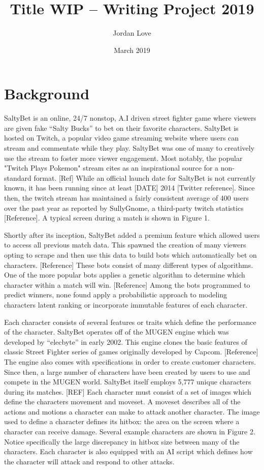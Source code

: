 \documentclass{article}
\title{Title WIP -- Writing Project 2019}
\author{Jordan Love}
\date{March 2019}
\begin{document}
\maketitle

\section{Background}

SaltyBet is an online, 24/7 nonstop, A.I driven street fighter game where viewers are given fake ``Salty Bucks'' to bet on their favorite characters. SaltyBet is hosted on Twitch, a popular video game streaming website where users can stream and commentate while they play. SaltyBet was one of many to creatively use the stream to foster more viewer engagement. Most notably, the popular "Twitch Plays Pokemon" stream cites as an inspirational source for a non-standard format. [Ref] While an official launch date for SaltyBet is not currently known, it has been running since at least [DATE] 2014 [Twitter reference]. Since then, the twitch stream has maintained a fairly consistent average of 400 users over the past year as reported by SullyGnome, a third-party twitch statistics [Reference]. A typical screen during a match is shown in Figure 1.

Shortly after its inception, SaltyBet added a premium feature which allowed users to access all previous match data. This spawned the creation of many viewers opting to scrape and then use this data to build bots which automatically bet on characters. [Reference] These bots consist of many different types of algorithms. One of the more popular bots applies a genetic algorithm to determine which character within a match will win. [Reference] Among the bots programmed to predict winners, none found apply a probabilistic approach to modeling characters latent ranking or incorporate immutable features of each character. 

Each character consists of several features or traits which define the performance of the character. SaltyBet operates off of the MUGEN engine which was developed by ``elecbyte'' in early 2002. This engine clones the basic features of classic Street Fighter series of games originally developed by Capcom. [Reference] The engine also comes with specifications in order to create customer characters. Since then, a large number of characters have been created by users to use and compete in the MUGEN world. SaltyBet itself employs 5,777 unique characters during its matches. [REF] Each character must consist of a set of images which define the characters movement and moveset. A moveset describes all of the actions and motions a character can make to attack another character. The image used to define a character defines its hitbox: the area on the screen where a character can receive damage. Several example characters are shown in Figure 2. Notice specifically the large discrepancy in hitbox size between many of the characters. Each character is also equipped with an AI script which defines how the character will attack and respond to other attacks.
\end{document}
